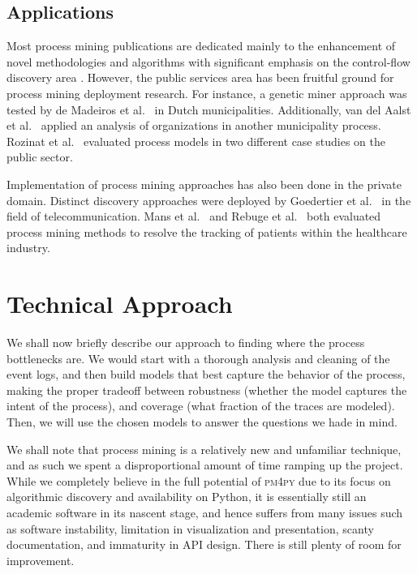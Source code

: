 \documentclass[conference]{IEEEtran}
\begin{document}
\subsection{Applications}

Most process mining publications are dedicated mainly to the enhancement
of novel methodologies and algorithms with significant emphasis on the
control-flow discovery area \cite{van2004}. However, the public services area
has been fruitful ground
for process mining deployment research. For instance, a
genetic miner approach was tested by de Madeiros et al.~\cite{deMe2007}
in Dutch municipalities. Additionally, van del Aalst et al.~\cite{RoDJ2009}
applied an analysis of organizations in another municipality process.
Rozinat et al.~\cite{RoMa2009} evaluated process models in two different case
studies on the public sector.

Implementation of process mining approaches has also been done in
the private domain. Distinct discovery approaches were
deployed by Goedertier et al.~\cite{GoDW2011} in the field of
telecommunication. Mans
et al.~\cite{MaSc2008} and Rebuge et al.~\cite{ReBu2012} both
evaluated process mining methods
to resolve the tracking of patients within the healthcare industry.

\section{Technical Approach}
\label{section-technical}

We shall now briefly describe our approach to finding
where the process bottlenecks are. We would start with a thorough analysis and
cleaning of the event logs, and then
build models that best capture the behavior of the
process, making the proper tradeoff
between robustness (whether the model captures the intent of the process),
and coverage (what fraction of the traces are modeled).
 Then, we will use the
chosen models to answer the questions we hade in mind.

We shall note that process mining is a relatively new and unfamiliar
technique, and
as such we spent a disproportional amount of time ramping up the project.
While we completely believe in the full potential of \textsc{pm4py} due to
its focus on algorithmic discovery and availability
on Python, it is
essentially still an academic software in its nascent stage, and 
hence suffers from many issues such as software instability,
limitation in visualization and presentation, scanty documentation,
and immaturity in API design.  There is still plenty of room for
improvement.
\end{document}
